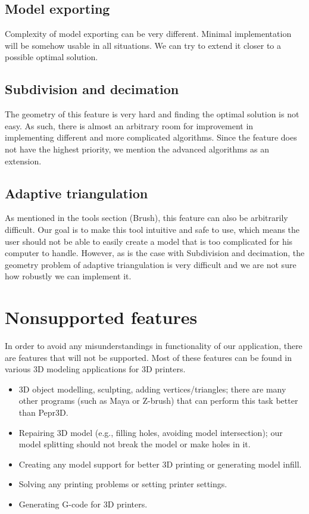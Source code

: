 \subsection{Model exporting}

Complexity of model exporting can be very different. Minimal implementation will be somehow usable in all situations. We can try to extend it closer to a possible optimal solution.


\subsection{Subdivision and decimation}

The geometry of this feature is very hard and finding the optimal solution is not easy. As such, there is almost an arbitrary room for improvement in implementing different and more complicated algorithms. Since the feature does not have the highest priority, we mention the advanced algorithms as an extension.

\subsection{Adaptive triangulation}

As mentioned in the tools section (Brush), this feature can also be arbitrarily difficult. Our goal is to make this tool intuitive and safe to use, which means the user should not be able to easily create a model that is too complicated for his computer to handle. However, as is the case with Subdivision and decimation, the geometry problem of adaptive triangulation is very difficult and we are not sure how robustly we can implement it.


\section{Nonsupported features}

In order to avoid any misunderstandings in functionality of our application, there are features that will not be supported. Most of these features can be found in various 3D modeling applications for 3D printers.

\begin{itemize}
\item 3D object modelling, sculpting, adding vertices/triangles; there are many other programs (such as Maya or Z-brush) that can perform this task better than Pepr3D.
\item Repairing 3D model (e.g., filling holes, avoiding model intersection); our model splitting should not break the model or make holes in it.
\item Creating any model support for better 3D printing or generating model infill.
\item Solving any printing problems or setting printer settings.
\item Generating G-code for 3D printers.
\end{itemize}










